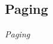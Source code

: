 \subsection{Paging}\label{subsec:Paging}
\begin{definition}[Paging]\label{def:Paging}
  \emph{Paging}
\end{definition}
